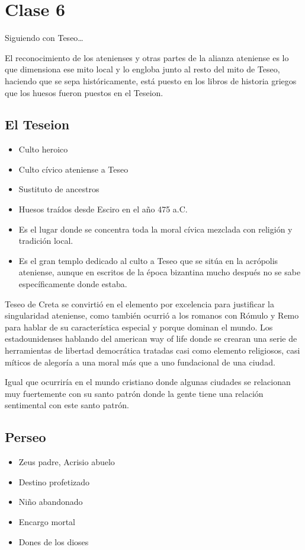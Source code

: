 \chapter{Clase 6}\label{ch:clase6}
Siguiendo con Teseo\dots

El reconocimiento de los atenienses y otras partes de la alianza ateniense es lo que dimensiona ese mito local y lo engloba junto al resto del mito de Teseo, haciendo que se sepa históricamente, está puesto en los libros de historia griegos que los huesos fueron puestos en el Teseion.

\section{El Teseion}
\begin{itemize}
    \item Culto heroico
    \item Culto cívico ateniense a Teseo
    \item Sustituto de ancestros
    \item Huesos traídos desde Esciro en el año 475 a.C.
    \item Es el lugar donde se concentra toda la moral cívica mezclada con religión y tradición local.
    \item Es el gran templo dedicado al culto a Teseo que se sitúa en la acrópolis ateniense, aunque en escritos de la época bizantina mucho después no se sabe específicamente donde estaba.
\end{itemize}

Teseo de Creta se convirtió en el elemento por excelencia para justificar la singularidad ateniense, como también ocurrió a los romanos con Rómulo y Remo para hablar de su característica especial y porque dominan el mundo. Los estadounidenses hablando del american way of life donde se crearan una serie de herramientas de libertad democrática tratadas casi como elemento religiosos, casi míticos de alegoría a una moral más que a uno fundacional de una ciudad.

Igual que ocurriría en el mundo cristiano donde algunas ciudades se relacionan muy fuertemente con su santo patrón donde la gente tiene una relación sentimental con este santo patrón.

\section{Perseo}
\begin{itemize}
    \item Zeus padre, Acrisio abuelo
    \item Destino profetizado
    \item Niño abandonado
    \item Encargo mortal
    \item Dones de los dioses
\end{itemize}

